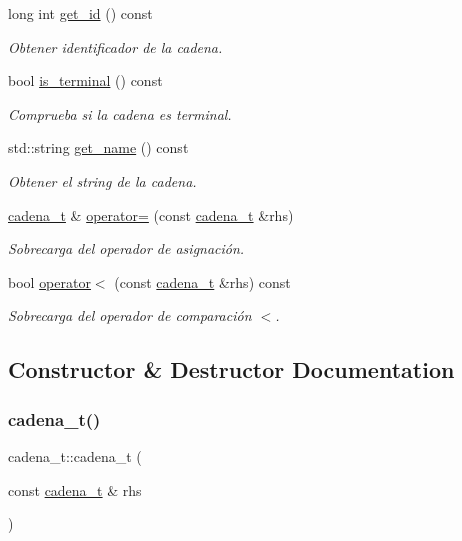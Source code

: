 \begin{DoxyCompactItemize}
long int \hyperlink{classcadena__t_a89bcb7dc7f3d9d74f2b30c6bed40e3c7}{get\+\_\+id} () const
\begin{DoxyCompactList}\small\item\em Obtener identificador de la cadena. \end{DoxyCompactList}\item 
bool \hyperlink{classcadena__t_a995b3ffd506dcd9423735e30608fb964}{is\+\_\+terminal} () const
\begin{DoxyCompactList}\small\item\em Comprueba si la cadena es terminal. \end{DoxyCompactList}\item 
std\+::string \hyperlink{classcadena__t_ae6de49c82b099053b5deb2152a011d5a}{get\+\_\+name} () const
\begin{DoxyCompactList}\small\item\em Obtener el string de la cadena. \end{DoxyCompactList}\item 
\hyperlink{classcadena__t}{cadena\+\_\+t} \& \hyperlink{classcadena__t_a2530672a609a4effd3d87c80e3c02baf}{operator=} (const \hyperlink{classcadena__t}{cadena\+\_\+t} \&rhs)
\begin{DoxyCompactList}\small\item\em Sobrecarga del operador de asignación. \end{DoxyCompactList}\item 
bool \hyperlink{classcadena__t_ace7a00008898a748dee49aa9e079793b}{operator$<$} (const \hyperlink{classcadena__t}{cadena\+\_\+t} \&rhs) const
\begin{DoxyCompactList}\small\item\em Sobrecarga del operador de comparación $<$. \end{DoxyCompactList}\end{DoxyCompactItemize}


\subsection{Constructor \& Destructor Documentation}
\mbox{\label{classcadena__t_accad06f41be0debb029950908bd1bd4a}} 
\subsubsection{\texorpdfstring{cadena\+\_\+t()}{cadena\_t()}}
{\footnotesize\ttfamily cadena\+\_\+t\+::cadena\+\_\+t (\begin{DoxyParamCaption}\item[{const \hyperlink{classcadena__t}{cadena\+\_\+t} \&}]{rhs }\end{DoxyParamCaption})}




